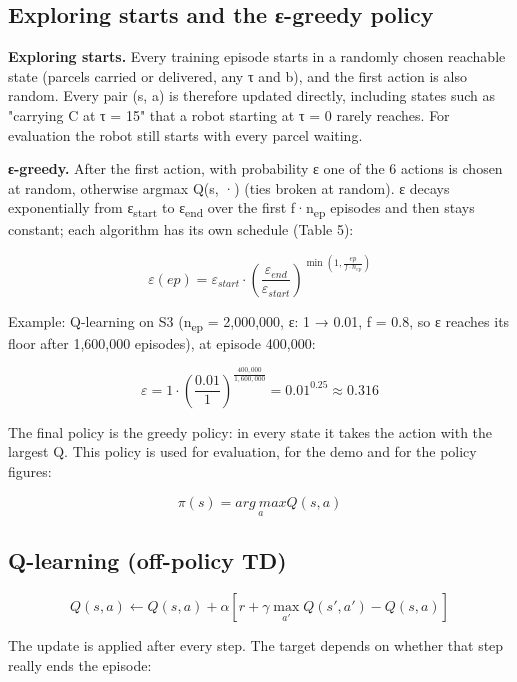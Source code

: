 \documentclass[12pt,a4paper]{article}
\begin{document}
\hypertarget{exploring-starts-and-the-ux3b5-greedy-policy}{%
\subsection{Exploring starts and the ε-greedy
policy}\label{exploring-starts-and-the-ux3b5-greedy-policy}}

\textbf{Exploring starts.} Every training episode starts in a randomly
chosen reachable state (parcels carried or delivered, any τ and b), and
the first action is also random. Every pair (s, a) is therefore updated
directly, including states such as "carrying C at τ = 15" that a robot
starting at τ = 0 rarely reaches. For evaluation the robot still starts
with every parcel waiting.

\textbf{ε-greedy.} After the first action, with probability ε one of the
6 actions is chosen at random, otherwise argmax Q(s, ·) (ties broken at
random). ε decays exponentially from ε\textsubscript{start} to
ε\textsubscript{end} over the first f·n\textsubscript{ep} episodes and
then stays constant; each algorithm has its own schedule (Table 5):

\[\varepsilon(ep) = \varepsilon_{start} \cdot \left( \frac{\varepsilon_{end}}{\varepsilon_{start}} \right)^{\min\left( 1,\frac{ep}{f \cdot n_{ep}} \right)}\]

Example: Q-learning on S3 (n\textsubscript{ep} = 2,000,000, ε: 1 → 0.01,
f = 0.8, so ε reaches its floor after 1,600,000 episodes), at episode
400,000:

\[\varepsilon = 1 \cdot \left( \frac{0.01}{1} \right)^{\frac{400,000}{1,600,000}} = {0.01}^{0.25} \approx 0.316\]

The final policy is the greedy policy: in every state it takes the
action with the largest Q. This policy is used for evaluation, for the
demo and for the policy figures:

\[\pi(s) = \underset{a}{arg\ max}{Q(s,a)}\]

\hypertarget{q-learning-off-policy-td}{%
\subsection{Q-learning (off-policy
TD)}\label{q-learning-off-policy-td}}

\[Q(s,a) \leftarrow Q(s,a) + \alpha\left\lbrack r + \gamma\max_{a'}{Q(s',a')} - Q(s,a) \right\rbrack\]

The update is applied after every step. The target depends on whether
that step really ends the episode:
\end{document}
